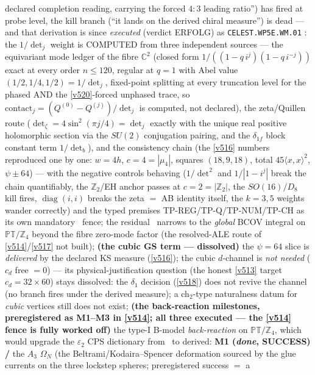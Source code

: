 \documentclass[11pt,a4paper]{article}
\newcommand{\Z}{\mathbb Z}
\begin{document}
\begin{itemize}
\begin{itemize}
declared completion reading, carrying the forced $4{:}3$ leading ratio'') has fired at probe
level, the kill branch (``it lands on the derived chiral measure'') is dead --- and that
derivation is since \emph{executed} (verdict ERFOLG) as \texttt{CELEST.WP5E.WM.01}
: the $1/\det_j$ weight is COMPUTED from three
independent sources --- the equivariant mode ledger of the fibre $\mathbb C^2$ (closed form
$1/((1-q\,i^j)(1-q\,i^{-j}))$ exact at every order $n \le 120$, regular at $q = 1$ with Abel
value $(1/2, 1/4, 1/2) = 1/\det_j$, fixed-point splitting at every truncation level for the
phased AND the \vref{v520}-forced unphased trace, so
$\mathrm{contact}_j = (Q^{(0)}-Q^{(j)})/\det_j$ is computed, not declared), the zeta/Quillen
route ($\det_\zeta = 4\sin^2(\pi j/4) = \det_j$ exactly with the unique real positive
holomorphic section via the $SU(2)$ conjugation pairing, and the $\delta_{1f}$ block constant
term $1/\det_b$), and the consistency chain (the \vref{v516} numbers reproduced one by one:
$w = 4h$, $c = 4 = |\mu_4|$, squares $(18, 9, 18)$, total $45\langle x,x\rangle^2$,
$\psi \pm 64$) --- with the negative controls behaving ($1/\det^2$ and $1/|1-i^j|$ break the
chain quantifiably, the $\Z_2$/EH anchor passes at $c = 2 = |\Z_2|$, the $SO(16)/D_8$ kill
fires, $\operatorname{diag}(i,i)$ breaks the zeta $=$ AB identity itself, the $k = 3, 5$
weights wander correctly) and the typed premises TP-REG/TP-Q/TP-NUM/TP-CH as its own
mandatory \mC\ fence; the residual \mO\ narrows to the \emph{global} BCOV integral on
$\mathbb{PT}/\Z_4$ beyond the fibre zero-mode factor (the resolved-ALE route of
\vref{v514}/\vref{v517} not built);
\textbf{(the cubic GS
term --- dissolved)} the $\psi=64$ slice is \emph{delivered} by the declared KS measure
(\vref{v516}); the cubic $d$-channel is \emph{not needed} ($c_d$ free $=0$) --- its
physical-justification question (the honest \vref{v513} target $c_d=32\times60$) stays
dissolved: the $\delta_1$ decision (\vref{v518}) does not revive the channel (no branch fires
under the derived measure); a
ch$_2$-type naturalness datum for \emph{cubic} vertices still does not exist;
\textbf{(the back-reaction milestones, preregistered as M1--M3 in \vref{v514}; all three
executed --- the \vref{v514} fence is fully worked off)} the
type-I B-model
\emph{back-reaction} on $\mathbb{PT}/\Z_4$, which would upgrade the $\varepsilon_2$ CPS
dictionary from \mC\ to derived: \textbf{M1 (\emph{done}, SUCCESS) \mE/\mC} the $A_3$ $\Omega_N$
(the Beltrami/Kodaira--Spencer
deformation sourced by the glue currents on the three lockstep spheres; preregistered success $=$ a

\end{itemize}
\end{itemize}
\end{document}
